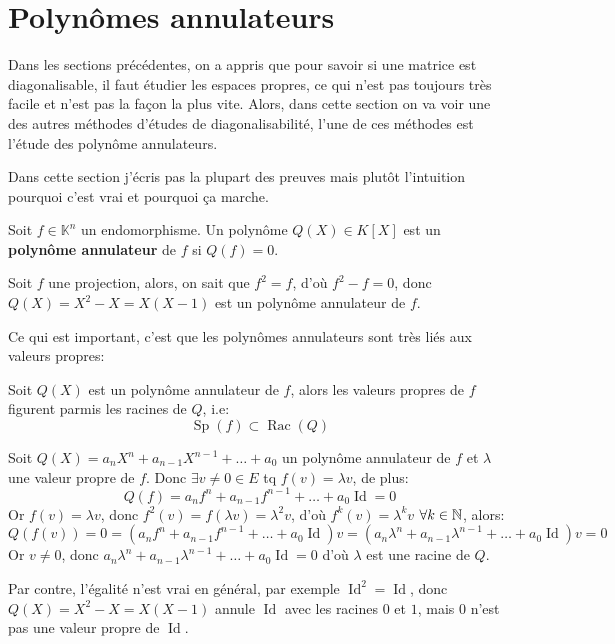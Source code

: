 \section{Polynômes annulateurs}
Dans les sections précédentes, on a appris que pour savoir si une matrice est diagonalisable, il faut étudier les espaces propres, ce qui n'est pas toujours très facile et n'est pas la façon la plus vite. Alors, dans cette section on va voir une des autres méthodes d'études de diagonalisabilité, l'une de ces méthodes est l'étude des polynôme annulateurs.

\begin{remark}
   Dans cette section j'écris pas la plupart des preuves mais plutôt l'intuition pourquoi c'est vrai et pourquoi ça marche. 
\end{remark}

\begin{definition}\label{def:polynome-annulateur}
    Soit $f \in \mathbb{K}^n$ un endomorphisme. Un polynôme $Q(X) \in K[X]$ est un \textbf{polynôme annulateur} de $f$ si  $Q(f) = 0$.
\end{definition}
\begin{eg}
   Soit $f$ une projection, alors, on sait que $f^2 = f$, d'où $f^2 - f = 0$, donc  $Q(X) = X^2 - X = X(X - 1)$ est un polynôme annulateur de  $f$.
\end{eg}

Ce qui est important, c'est que les polynômes annulateurs sont très liés aux valeurs propres:
\begin{prop}
   Soit $Q(X)$ est un polynôme annulateur de  $f$, alors les valeurs propres de  $f$ figurent parmis les racines de  $Q$, i.e:
   \[
       \operatorname{Sp}(f) \subset \operatorname{Rac}(Q)
   \] 
\end{prop}
\begin{preuve}
    Soit $Q(X) = a_n X^n + a_{n-1} X^{n-1} + \ldots + a_0$ un polynôme annulateur de $f$ et  $\lambda$ une valeur propre de  $f$. Donc  $\exists v \neq 0 \in E$ tq $f(v) = \lambda v$, de plus:
    \[
        Q(f) = a_n f^n + a_{n-1} f^{n-1} + \ldots + a_0 \operatorname{Id} = 0
    \] 
    Or $f(v) = \lambda v$, donc  $f^2(v) = f(\lambda v) = \lambda^2 v$, d'où  $f^k(v) = \lambda^k v$  $\forall k \in \mathbb{N}$, alors:
    \[
        Q(f(v)) = 0 = (a_n f^n + a_{n-1} f^{n-1} + \ldots + a_0 \operatorname{Id})v = (a_n \lambda^n + a_{n-1} \lambda^{n-1} + \ldots + a_0 \operatorname{Id})v = 0
     \] 
     Or $v \neq 0$, donc $a_n \lambda^n + a_{n-1} \lambda^{n-1} + \ldots + a_0 \operatorname{Id} = 0$ d'où  $\lambda$ est une racine de  $Q$.
\end{preuve}
\begin{note}
    Par contre, l'égalité n'est vrai en général, par exemple $\operatorname{Id}^2 = \operatorname{Id}$, donc  $Q(X) = X^2 - X = X(X - 1)$ annule $\operatorname{Id}$ avec les racines  $0$ et  $1$, mais  $0$ n'est pas une valeur propre de  $\operatorname{Id}$.
\end{note}

